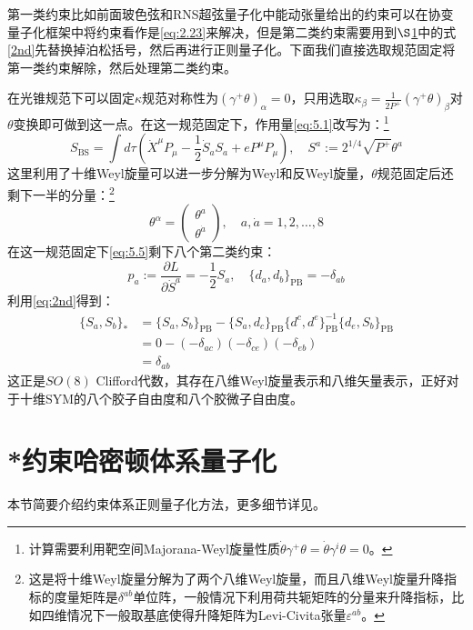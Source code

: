 第一类约束比如前面玻色弦和RNS超弦量子化中能动张量给出的约束可以在协变量子化框架中将约束看作是\ref{eq:2.23}来解决，但是第二类约束需要用到$\S$\ref{sec:5.2}中的式\ref{2nd}先替换掉泊松括号，然后再进行正则量子化。下面我们直接选取规范固定将第一类约束解除，然后处理第二类约束。

在光锥规范下可以固定$\kappa$规范对称性为$(\gamma^+\theta)_\alpha=0$，只用选取$\kappa_\beta=\frac{1}{2P^+}(\gamma^+\theta)_\beta$对$\theta$变换即可做到这一点。在这一规范固定下，作用量\ref{eq:5.1}改写为：\footnote{计算需要利用靶空间Majorana-Weyl旋量性质$\dot{\theta}\gamma^+\theta=\dot{\theta}\gamma^i\theta=0$。}
\begin{equation}
S_{\text{BS}}=\int d\tau\left(\dot{X}^\mu P_\mu-\frac{1}{2}\dot{S}_aS_a+eP^\mu P_\mu\right),\quad S^a:=2^{1/4}\sqrt{P^+}\theta^a
\end{equation}
这里利用了十维Weyl旋量可以进一步分解为Weyl和反Weyl旋量，$\theta$规范固定后还剩下一半的分量：\footnote{这是将十维Weyl旋量分解为了两个八维Weyl旋量，而且八维Weyl旋量升降指标的度量矩阵是$\delta^{ab}$单位阵，一般情况下利用荷共轭矩阵的分量来升降指标\cite{Freedman:2012zz}，比如四维情况下一般取基底使得升降矩阵为Levi-Civita张量$\varepsilon^{ab}$。}
\begin{equation}
	\theta^\alpha=\begin{pmatrix}\theta^a\\\theta^{\dot{a}}\end{pmatrix},\quad a,\dot{a}=1,2,\ldots,8
\end{equation}
在这一规范固定下\ref{eq:5.5}剩下八个第二类约束：
\begin{equation}
	p_a:=\frac{\partial L}{\partial\dot{S}^a}=-\frac{1}{2}S_a,\quad \{d_a,d_b\}_{\mathrm{PB}}=-\delta_{ab}
\end{equation}
利用\ref{eq:2nd}得到：
\begin{equation}
	\label{eq:5.10}
	\begin{aligned}
		\{S_a,S_b\}_*&=\{S_a,S_b\}_{\mathrm{PB}}-\{S_a,d_c\}_{\mathrm{PB}}\{d^c,d^e\}_{\mathrm{PB}}^{-1}\{d_e,S_b\}_{\mathrm{PB}}\\&=0-(-\delta_{ac})(-\delta_{ce})(-\delta_{eb})\\&=\delta_{ab}
	\end{aligned}
\end{equation}
这正是$SO(8)$ Clifford代数，其存在八维Weyl旋量表示和八维矢量表示，正好对于十维SYM的八个胶子自由度和八个胶微子自由度。
\section{*约束哈密顿体系量子化}
\label{sec:5.2}
本节简要介绍约束体系正则量子化方法，更多细节详见\cite{lcb,dirac}。
